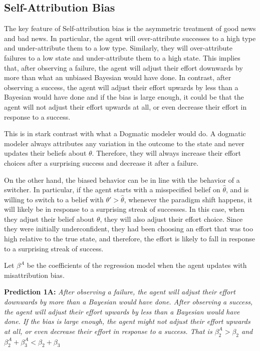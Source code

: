 \documentclass[
  12pt,
]{article}
\begin{document}
\hypertarget{self-attribution-bias}{%
\subsection{Self-Attribution Bias}\label{self-attribution-bias}}

The key feature of Self-attribution bias is the asymmetric treatment of
good news and bad news. In particular, the agent will over-attribute
successes to a high type and under-attribute them to a low type.
Similarly, they will over-attribute failures to a low state and
under-attribute them to a high state. This implies that, after observing
a failure, the agent will adjust their effort downwards by more than
what an unbiased Bayesian would have done. In contrast, after observing
a success, the agent will adjust their effort upwards by less than a
Bayesian would have done and if the bias is large enough, it could be
that the agent will not adjust their effort upwards at all, or even
decrease their effort in response to a success.

This is in stark contrast with what a Dogmatic modeler would do. A
dogmatic modeler always attributes any variation in the outcome to the
state and never updates their beliefs about \(\theta\). Therefore, they
will always increase their effort choices after a surprising success and
decrease it after a failure.

On the other hand, the biased behavior can be in line with the behavior
of a switcher. In particular, if the agent starts with a misspecified
belief on \(\hat{\theta}\), and is willing to switch to a belief with
\(\theta'>\hat{\theta}\), whenever the paradigm shift happens, it will
likely be in response to a surprising streak of successes. In this case,
when they adjust their belief about \(\theta\), they will also adjust
their effort choice. Since they were initially underconfident, they had
been choosing an effort that was too high relative to the true state,
and therefore, the effort is likely to fall in response to a surprising
streak of success.

Let \(\beta^A\) be the coefficients of the regression model when the
agent updates with misattribution bias.

\textbf{Prediction 1A:} \emph{After observing a failure, the agent will
adjust their effort downwards by more than a Bayesian would have done.
After observing a success, the agent will adjust their effort upwards by
less than a Bayesian would have done. If the bias is large enough, the
agent might not adjust their effort upwards at all, or even decrease
their effort in response to a success. That is \(\beta_2^A > \beta_2\)
and \(\beta_2^A + \beta_3^A<\beta_2 + \beta_3\)}
\end{document}

